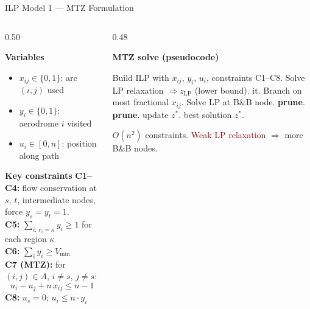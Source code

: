 \documentclass{beamer}
\begin{document}
\begin{frame}{ILP Model 1 --- MTZ Formulation}

\begin{columns}[T]
\begin{column}{0.50\textwidth}
\begin{block}{\textbf{Variables}}
\small
\begin{itemize}\setlength\itemsep{1pt}
  \item $x_{ij}\in\{0,1\}$: arc $(i,j)$ used
  \item $y_i\in\{0,1\}$: aerodrome $i$ visited
  \item $u_i\in[0,n]$: position along path
\end{itemize}
\end{block}

\vspace{4pt}

\begin{block}{\textbf{Key constraints}}
\small
\textbf{C1--C4:} flow conservation at $s$, $t$, intermediate nodes, force $y_s=y_t=1$.\\[3pt]
\textbf{C5:} $\sum_{i:\,r_i=\kappa} y_i \geq 1$ \quad for each region $\kappa$\\[3pt]
\textbf{C6:} $\sum_i y_i \geq V_{\min}$\\[3pt]
\textbf{C7 (MTZ):} for $(i,j)\in A$, $i\neq s$, $j\neq s$:
$$u_i - u_j + n\,x_{ij} \leq n-1$$
\textbf{C8:} $u_s=0$; $u_i \leq n\cdot y_i$
\end{block}
\end{column}

\begin{column}{0.48\textwidth}
\begin{block}{\textbf{MTZ solve (pseudocode)}}
\footnotesize
\begin{algorithmic}[1]
\State Build ILP with $x_{ij}$, $y_i$, $u_i$, constraints C1--C8.
\State Solve LP relaxation $\Rightarrow z_{\mathrm{LP}}$ (lower bound).
 \State \Return it. \EndIf
\Repeat
  \State Branch on most fractional $x_{ij}$.
  \State Solve LP at B\&B node.
   \State \textbf{prune}. \EndIf
   \State \textbf{prune}. \EndIf
   \State update $z^*$. \EndIf
{}
\State \Return best solution $z^*$.
\end{algorithmic}
\end{block}

\vspace{2pt}

{\footnotesize $O(n^2)$ constraints. \textcolor{darkred}{Weak LP relaxation} $\Rightarrow$ more B\&B nodes.}
\end{column}
\end{columns}

\end{frame}
\end{document}
